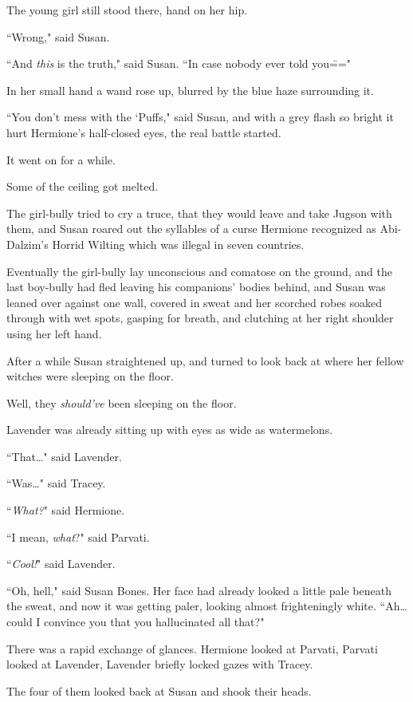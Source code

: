 The young girl still stood there, hand on her hip.

``Wrong," said Susan.

``And \emph{this} is the truth," said Susan. ``In case nobody ever told you\==="

In her small hand a wand rose up, blurred by the blue haze surrounding it.

``You don't mess with the `Puffs," said Susan, and with a grey flash so bright it hurt Hermione's half-closed eyes, the real battle started.

It went on for a while.

Some of the ceiling got melted.

The girl-bully tried to cry a truce, that they would leave and take Jugson with them, and Susan roared out the syllables of a curse Hermione recognized as Abi-Dalzim's Horrid Wilting which was illegal in seven countries.

Eventually the girl-bully lay unconscious and comatose on the ground, and the last boy-bully had fled leaving his companions' bodies behind, and Susan was leaned over against one wall, covered in sweat and her scorched robes soaked through with wet spots, gasping for breath, and clutching at her right shoulder using her left hand.

After a while Susan straightened up, and turned to look back at where her fellow witches were sleeping on the floor.

Well, they \emph{should've} been sleeping on the floor.

Lavender was already sitting up with eyes as wide as watermelons.

``That{\ldots}" said Lavender.

``Was{\ldots}" said Tracey.

``\emph{What?}" said Hermione.

``I mean, \emph{what}?" said Parvati.

``\emph{Cool!}" said Lavender.

``Oh, hell," said Susan Bones. Her face had already looked a little pale beneath the sweat, and now it was getting paler, looking almost frighteningly white. ``Ah{\ldots} could I convince you that you hallucinated all that?"

There was a rapid exchange of glances. Hermione looked at Parvati, Parvati looked at Lavender, Lavender briefly locked gazes with Tracey.

The four of them looked back at Susan and shook their heads.

